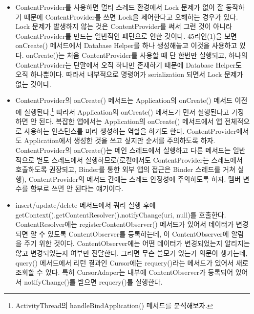 \begin{itemize}
\item ContentProvider를 사용하면 멀티 스레드 환경에서 Lock 문제가 없이 잘 동작하기 때문에 ContentProvider를 쓰면 Lock을 제어한다고 오해하는 경우가 있다. 
Lock 문제가 발생하지 않는 것은 ContentProvider를 써서 그런 것이 아니라 ContentProvider를 만드는 일반적인 패턴으로 인한 것이다.
45라인(1)을 보면 onCreate() 메서드에서 Database Helper를 하나 생성해놓고 이것을 사용하고 있다.
onCreate()는 처음 ContentProvider를 사용할 때 단 한번만 실행되고, 하나의 ContentProvider는 단말에서 오직 하나만 존재하기 때문에 Database Helper도 오직 하나뿐이다. 따라서 내부적으로 명령어가 serialization 되면서 Lock 문제가 없는 것이다.

\item ContentProvider의 onCreate() 메서드는 Application의 onCreate() 메서드 이전에 실행된다.\footnote{ActivityThread의 handleBindApplication() 메서드를 분석해보자.}
따라서 Application의 onCreate() 메서드가 먼저 실행된다고 가정하면 안 된다.
복잡한 앱에서는 Application의 onCreate() 메서드에서 앱 전체적으로 사용하는 인스턴스를 미리 생성하는 역할을 하기도 한다. ContentProvider에서도 Application에서 생성한 것을 쓰고 싶지만 순서를 주의하도록 하자.
ContentProvider의 onCreate()는 메인 스레드에서 실행하고 다른 메서드는 일반적으로 별도 스레드에서 실행하므로(로컬에서도 ContentProvider는 스레드에서 호출하도록 권장되고, Binder를 통한 외부 앱의 접근은 Binder 스레드를 거쳐 실행), ContentProvider의 메서드 간에는 스레드 안정성에 주의하도록 하자. 멤버 변수를 함부로 쓰면 안 된다는 얘기이다.

\item insert/update/delete 메서드에서 쿼리 실행 후에 getContext().getContentResolver().notifyChange(uri, null)를 호출한다. ContentResolver에는 registerContentObserver() 메서드가 있어서 데이터가 변경되면 알 수 있도록 ContentObserver를 등록하는데, 이 ContentObserver에 알림을 주기 위한 것이다. 
ContentObserver에는 어떤 데이터가 변경되었는지 알리지는 않고 변경되었는지 여부만 전달한다. 
그러면 무슨 쓸모가 있는가 의문이 생기는데,
query() 메서드에서 리턴 결과인 Cursor에는 requery()라는 메서드가 있어서 새로 조회할 수 있다. 특히 CursorAdaper는 내부에 ContentObserver가 등록되어 있어서 notifyChange()를 받으면 requery()를 실행한다.

\end{itemize}

